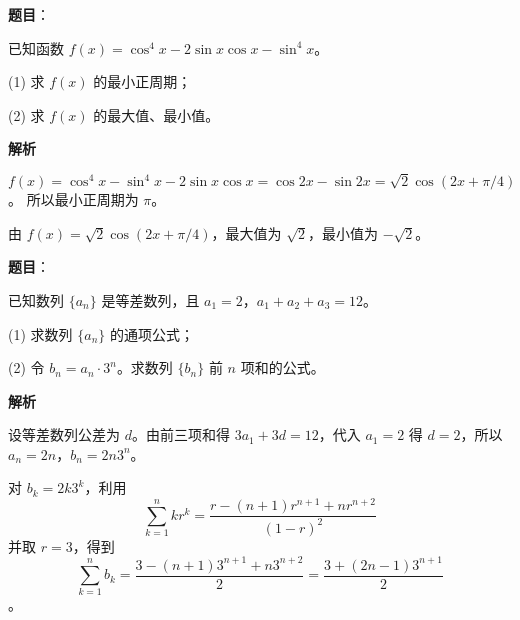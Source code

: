 \begin{answer}

\textbf{题目}：

已知函数 \(f(x)=\cos^4x-2\sin x\cos x-\sin^4x\)。

(1) 求 \(f(x)\) 的最小正周期；

(2) 求 \(f(x)\) 的最大值、最小值。

\textbf{解析}


\nopagebreak[4]
\[
f(x)=\cos^4x-\sin^4x-2\sin x\cos x=\cos2x-\sin2x=\sqrt2\cos(2x+\pi/4)
\]
。
所以最小正周期为 \(\pi\)。


由 \(f(x)=\sqrt2\cos(2x+\pi/4)\)，最大值为 \(\sqrt2\)，最小值为 \(-\sqrt2\)。



\end{answer}
\begin{answer}

\textbf{题目}：

已知数列 \(\{a_n\}\) 是等差数列，且 \(a_1=2\)，\(a_1+a_2+a_3=12\)。

(1) 求数列 \(\{a_n\}\) 的通项公式；

(2) 令 \(b_n=a_n\cdot3^n\)。求数列 \(\{b_n\}\) 前 \(n\) 项和的公式。

\textbf{解析}


设等差数列公差为 \(d\)。由前三项和得 \(3a_1+3d=12\)，代入 \(a_1=2\) 得 \(d=2\)，所以 \(a_n=2n\)，\(b_n=2n3^n\)。


对 \(b_k=2k3^k\)，利用
\nopagebreak[4]
\[
\sum_{k=1}^n kr^k=\frac{r-(n+1)r^{n+1}+nr^{n+2}}{(1-r)^2}
\]
并取 \(r=3\)，得到
\nopagebreak[4]
\[
\sum_{k=1}^n b_k=\frac{3-(n+1)3^{n+1}+n3^{n+2}}2=\frac{3+(2n-1)3^{n+1}}2
\]
。



\end{answer}
